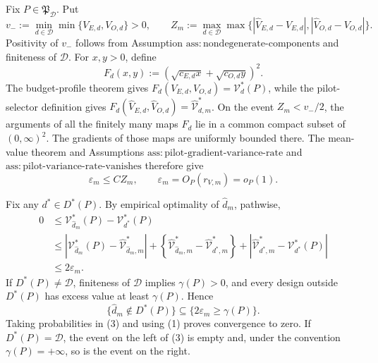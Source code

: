 Fix \(P\in\mathfrak P_{\mathcal D}\).  Put
\[
 v_-:=\min_{d\in\mathcal D}\min\{V_{E,d},V_{O,d}\}>0,
 \qquad
 Z_m:=\max_{d\in\mathcal D}\max\bigl\{
 |\widehat V_{E,d}-V_{E,d}|,
 |\widehat V_{O,d}-V_{O,d}|\bigr\}.
\]
Positivity of \(v_-\) follows from Assumption \(\mathrm{ass{:}nondegenerate\text{-}components}\) and finiteness of \(\mathcal D\).  For \(x,y>0\), define
\[
 F_d(x,y):=\left(\sqrt{c_{E,d}x}+\sqrt{c_{O,d}y}\right)^2.
\]
The budget-profile theorem gives
\(F_d(V_{E,d},V_{O,d})=\mathcal V_d^*(P)\), while the pilot-selector definition gives
\(F_d(\widehat V_{E,d},\widehat V_{O,d})=\widehat{\mathcal V}_{d,m}^*\).  On the event \(Z_m<v_-/2\), the arguments of all the finitely many maps \(F_d\) lie in a common compact subset of \((0,\infty)^2\).  The gradients of those maps are uniformly bounded there.  The mean-value theorem and Assumptions \(\mathrm{ass{:}pilot\text{-}gradient\text{-}variance\text{-}rate}\) and \(\mathrm{ass{:}pilot\text{-}variance\text{-}rate\text{-}vanishes}\) therefore give
\[
 \varepsilon_m\le C Z_m,
 \qquad
 \varepsilon_m=O_P(r_{V,m})=o_P(1).                                      \tag{1}
\]

Fix any \(d^*\in D^*(P)\).  By empirical optimality of \(\widehat d_m\), pathwise,
\[
\begin{aligned}
0
&\le \mathcal V_{\widehat d_m}^*(P)-\mathcal V_{d^*}^*(P)\\
&\le
 \left|\mathcal V_{\widehat d_m}^*(P)
       -\widehat{\mathcal V}_{\widehat d_m,m}^*\right|
 +\left\{\widehat{\mathcal V}_{\widehat d_m,m}^*
       -\widehat{\mathcal V}_{d^*,m}^*\right\}
 +\left|\widehat{\mathcal V}_{d^*,m}^*
       -\mathcal V_{d^*}^*(P)\right|\\
&\le 2\varepsilon_m .
\end{aligned}                                                              \tag{2}
\]
If \(D^*(P)\ne\mathcal D\), finiteness of \(\mathcal D\) implies \(\gamma(P)>0\), and every design outside \(D^*(P)\) has excess value at least \(\gamma(P)\).  Hence
\[
 \{\widehat d_m\notin D^*(P)\}
 \subseteq \{2\varepsilon_m\ge\gamma(P)\}.                              \tag{3}
\]
Taking probabilities in (3) and using (1) proves convergence to zero.  If \(D^*(P)=\mathcal D\), the event on the left of (3) is empty and, under the convention \(\gamma(P)=+\infty\), so is the event on the right.

